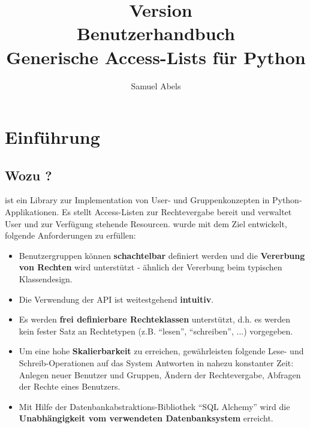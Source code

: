 \usepackage{german}   %
\title{\productname\ Version \productversion\\
Benutzerhandbuch\\
\vspace{5 mm}
\large Generische Access-Lists für Python}
\author{Samuel Abels}


\maketitle
\tableofcontents

\newpage
\section{Einführung}
\subsection{Wozu \productname?}

\product ist ein Library zur Implementation von User- und Gruppenkonzepten 
in Python-Applikationen. Es stellt Access-Listen zur Rechtevergabe 
bereit und verwaltet User und zur Verfügung stehende Resourcen.
\product wurde mit dem Ziel entwickelt, folgende Anforderungen zu erfüllen:

\begin{itemize}
\item Benutzergruppen können {\bf schachtelbar} definiert werden und die 
{\bf Vererbung von Rechten} wird unterstützt - ähnlich der Vererbung beim 
typischen Klassendesign.

\item Die Verwendung der API ist weitestgehend {\bf intuitiv}.

\item Es werden {\bf frei definierbare Rechteklassen} unterstützt, d.h. es 
werden kein fester Satz an Rechtetypen (z.B. ``lesen'', ``schreiben'', ...) 
vorgegeben.

\item Um eine hohe {\bf Skalierbarkeit} zu erreichen, gewährleisten folgende 
Lese- und Schreib-Operationen auf das System Antworten in nahezu konstanter 
Zeit: Anlegen neuer Benutzer und Gruppen, Ändern der Rechtevergabe, Abfragen 
der Rechte eines Benutzers.

\item Mit Hilfe der Datenbankabstraktions-Bibliothek ``SQL Alchemy'' wird 
die {\bf Unabhängigkeit vom verwendeten Datenbanksystem} erreicht.
\end{itemize}

